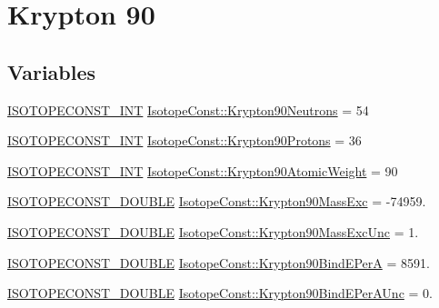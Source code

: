 \hypertarget{group___isotope_const-_krypton-_kr90}{}\section{Krypton 90}
\label{group___isotope_const-_krypton-_kr90}
\subsection*{Variables}
\begin{DoxyCompactItemize}
\item 
\mbox{\hyperlink{group___isotope_const-_macros_ga5f18360b3e99483a35c32d789e62621c}{I\+S\+O\+T\+O\+P\+E\+C\+O\+N\+S\+T\+\_\+\+I\+NT}} \mbox{\hyperlink{group___isotope_const-_krypton-_kr90_ga51a7710b7cd30479dc965407f413198d}{Isotope\+Const\+::\+Krypton90\+Neutrons}} = 54
\item 
\mbox{\hyperlink{group___isotope_const-_macros_ga5f18360b3e99483a35c32d789e62621c}{I\+S\+O\+T\+O\+P\+E\+C\+O\+N\+S\+T\+\_\+\+I\+NT}} \mbox{\hyperlink{group___isotope_const-_krypton-_kr90_ga4ad7a4dee295bdf16668b4cb9782c7ed}{Isotope\+Const\+::\+Krypton90\+Protons}} = 36
\item 
\mbox{\hyperlink{group___isotope_const-_macros_ga5f18360b3e99483a35c32d789e62621c}{I\+S\+O\+T\+O\+P\+E\+C\+O\+N\+S\+T\+\_\+\+I\+NT}} \mbox{\hyperlink{group___isotope_const-_krypton-_kr90_ga8792e3fab77b6c1e98833df830b762b0}{Isotope\+Const\+::\+Krypton90\+Atomic\+Weight}} = 90
\item 
\mbox{\hyperlink{group___isotope_const-_macros_ga8f45a7272ce02c0b4c65c44636ed719a}{I\+S\+O\+T\+O\+P\+E\+C\+O\+N\+S\+T\+\_\+\+D\+O\+U\+B\+LE}} \mbox{\hyperlink{group___isotope_const-_krypton-_kr90_ga2e52497f1812ef96569ee936b4f7f2d4}{Isotope\+Const\+::\+Krypton90\+Mass\+Exc}} = -\/74959.
\item 
\mbox{\hyperlink{group___isotope_const-_macros_ga8f45a7272ce02c0b4c65c44636ed719a}{I\+S\+O\+T\+O\+P\+E\+C\+O\+N\+S\+T\+\_\+\+D\+O\+U\+B\+LE}} \mbox{\hyperlink{group___isotope_const-_krypton-_kr90_ga162bbd0779ffec2007c7582d1daf07e1}{Isotope\+Const\+::\+Krypton90\+Mass\+Exc\+Unc}} = 1.
\item 
\mbox{\hyperlink{group___isotope_const-_macros_ga8f45a7272ce02c0b4c65c44636ed719a}{I\+S\+O\+T\+O\+P\+E\+C\+O\+N\+S\+T\+\_\+\+D\+O\+U\+B\+LE}} \mbox{\hyperlink{group___isotope_const-_krypton-_kr90_gadb37e24717f0b380b5eaab87b1ca4508}{Isotope\+Const\+::\+Krypton90\+Bind\+E\+PerA}} = 8591.
\item 
\mbox{\hyperlink{group___isotope_const-_macros_ga8f45a7272ce02c0b4c65c44636ed719a}{I\+S\+O\+T\+O\+P\+E\+C\+O\+N\+S\+T\+\_\+\+D\+O\+U\+B\+LE}} \mbox{\hyperlink{group___isotope_const-_krypton-_kr90_gaf386b7750d9bd570e91f124aa0b7cf55}{Isotope\+Const\+::\+Krypton90\+Bind\+E\+Per\+A\+Unc}} = 0.

\end{DoxyCompactItemize}
